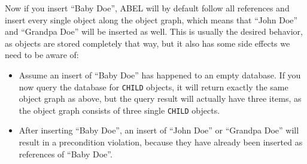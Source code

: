 \documentclass[a4paper,12pt]{report}
\begin{document}
	\begin{center}
	\end{center}

Now if you insert ``Baby Doe'', ABEL will by default follow all references and insert every single object along the object graph, which means that ``John Doe'' and ``Grandpa Doe'' will be inserted as well.
This is usually the desired behavior, as objects are stored completely that way, but it also has some side effects we need to be aware of:

\begin{itemize}
\item Assume an insert of ``Baby Doe'' has happened to an empty database. 
If you now query the database for \lstinline!CHILD! objects, it will return exactly the same object graph as above, 
but the query result will actually have three items, as the object graph consists of three single \lstinline!CHILD! objects.
	
\item After inserting ``Baby Doe'', an insert of ``John Doe'' or ``Grandpa Doe'' will result in a precondition violation, because they have already been inserted as references of ``Baby Doe''.
\end{itemize}
\end{document}
